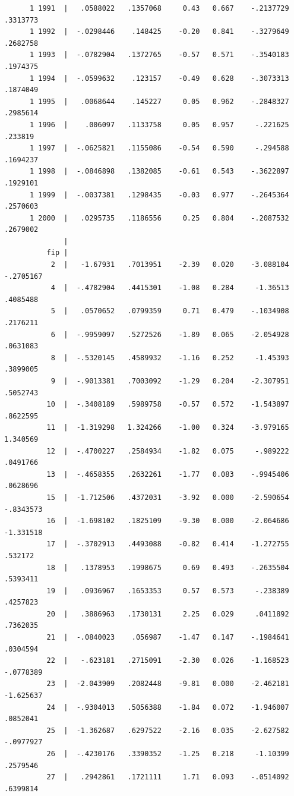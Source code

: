 \documentclass[
]{book}
\begin{document}
\begin{verbatim}
      1 1991  |   .0588022   .1357068     0.43   0.667    -.2137729    .3313773
      1 1992  |  -.0298446    .148425    -0.20   0.841    -.3279649    .2682758
      1 1993  |  -.0782904   .1372765    -0.57   0.571    -.3540183    .1974375
      1 1994  |  -.0599632    .123157    -0.49   0.628    -.3073313    .1874049
      1 1995  |   .0068644    .145227     0.05   0.962    -.2848327    .2985614
      1 1996  |    .006097   .1133758     0.05   0.957     -.221625     .233819
      1 1997  |  -.0625821   .1155086    -0.54   0.590     -.294588    .1694237
      1 1998  |  -.0846898   .1382085    -0.61   0.543    -.3622897    .1929101
      1 1999  |  -.0037381   .1298435    -0.03   0.977    -.2645364    .2570603
      1 2000  |   .0295735   .1186556     0.25   0.804    -.2087532    .2679002
              |
          fip |
           2  |   -1.67931   .7013951    -2.39   0.020    -3.088104   -.2705167
           4  |  -.4782904   .4415301    -1.08   0.284     -1.36513    .4085488
           5  |   .0570652   .0799359     0.71   0.479    -.1034908    .2176211
           6  |  -.9959097   .5272526    -1.89   0.065    -2.054928    .0631083
           8  |  -.5320145   .4589932    -1.16   0.252     -1.45393    .3899005
           9  |  -.9013381   .7003092    -1.29   0.204    -2.307951    .5052743
          10  |  -.3408189   .5989758    -0.57   0.572    -1.543897    .8622595
          11  |  -1.319298   1.324266    -1.00   0.324    -3.979165    1.340569
          12  |  -.4700227   .2584934    -1.82   0.075     -.989222    .0491766
          13  |  -.4658355   .2632261    -1.77   0.083    -.9945406    .0628696
          15  |  -1.712506   .4372031    -3.92   0.000    -2.590654   -.8343573
          16  |  -1.698102   .1825109    -9.30   0.000    -2.064686   -1.331518
          17  |  -.3702913   .4493088    -0.82   0.414    -1.272755     .532172
          18  |   .1378953   .1998675     0.69   0.493    -.2635504    .5393411
          19  |   .0936967   .1653353     0.57   0.573     -.238389    .4257823
          20  |   .3886963   .1730131     2.25   0.029     .0411892    .7362035
          21  |  -.0840023    .056987    -1.47   0.147    -.1984641    .0304594
          22  |   -.623181   .2715091    -2.30   0.026    -1.168523   -.0778389
          23  |  -2.043909   .2082448    -9.81   0.000    -2.462181   -1.625637
          24  |  -.9304013   .5056388    -1.84   0.072    -1.946007    .0852041
          25  |  -1.362687   .6297522    -2.16   0.035    -2.627582   -.0977927
          26  |  -.4230176   .3390352    -1.25   0.218     -1.10399    .2579546
          27  |   .2942861   .1721111     1.71   0.093    -.0514092    .6399814

\end{verbatim}
\end{document}
